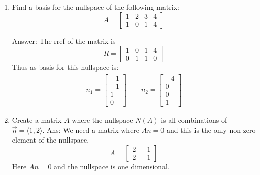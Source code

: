 \documentclass[10pt, a4paper]{article}
\theoremstyle{break}
\begin{document}
\begin{enumerate}
\item Find a basis for the nullspace of the following matrix:
\begin{equation}
A=
\begin{bmatrix}
1 & 2 & 3 &4 \\
1 &0 & 1 &4 
\end{bmatrix}
\nonumber
\end{equation}

Answer: The rref of the matrix is 
\begin{equation}
R=
\begin{bmatrix}
1 & 0 & 1 &4 \\
0 &1& 1 &0
\end{bmatrix}
\nonumber
\end{equation}
Thus as basis for this nullspace is:
\begin{align}
n_1=\begin{bmatrix} -1 \\ -1 \\1 \\ 0\end{bmatrix} \qquad n_2=\begin{bmatrix} -4\\ 0 \\ 0 \\ 1 \end{bmatrix} 
\end{align}






\item Create a matrix $A$ where the nullspace $N(A)$ is all combinations of $\vec{n}=\langle 1, 2 \rangle$.
Ans: We need a matrix where $An=0$ and this is the only non-zero element of the nullspace. 
\begin{equation}
A=
\begin{bmatrix}
2 & -1  \\
2 &-1
\end{bmatrix}
\nonumber
\end{equation}
Here $An=0$ and the nullspace is one dimensional. 




\end{enumerate}
\end{document}
